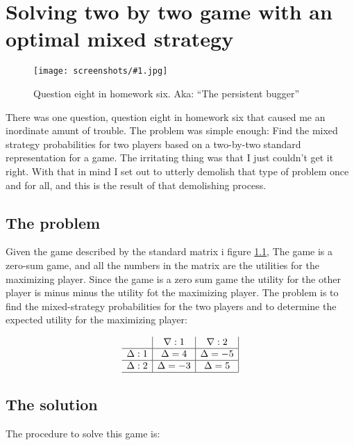 \documentclass[a4, 12pt, english, USenglish]{scrreprt}
\newcommand{\screenshot}[2]{
\begin{figure}[htb]
\texttt{[image: screenshots/\#1.jpg]}
\label{#1}
\caption{#2}
\end{figure}}
\begin{document}
\appendix

\chapter{Solving two by two game with an optimal mixed strategy}

\screenshot{maxminanswer}{Question eight in homework
  six. Aka: ``The persistent bugger''}

There was one question, question eight in homework six that caused me
an inordinate amunt of trouble.  The problem was simple enough: Find
the mixed strategy probabilities for two players based on a two-by-two
standard representation for a game.  The irritating thing was that I
just couldn't get it right.  With that in mind I set out to utterly
demolish that type of problem once and for all, and this is the result
of that demolishing process.


\section{The problem}

Given the game described by the standard matrix i figure
\ref{maxminanswer}, The game is a zero-sum game, and all the numbers
in the matrix are the utilities for the maximizing player.  Since the
game is a zero sum game the utility for the other player is minus
minus the utility fot the maximizing player.  The problem is to find
the mixed-strategy probabilities for the two players and to determine
the expected utility for the maximizing player:

\[
\begin{array}{l|c|c|}
 &\nabla :1 & \nabla :2 \\
\hline
\Delta:1 & \Delta = 4 & \Delta = -5  \\ \hline
\Delta:2 & \Delta = -3 & \Delta =   5  \\
\hline
\end{array}
\]

\section{The solution}

The procedure to solve this game is:
\end{document}
